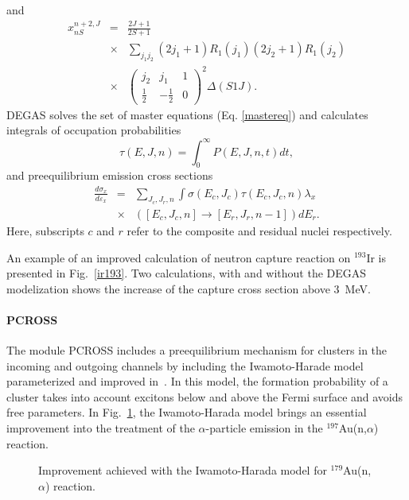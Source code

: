 \documentclass[twocolumn,amsmath,amssymb,10pt,groupedaddress,a4paper]{revtex4}
\begin{document}
and
\begin{eqnarray}
x_{nS}^{n+2,J}&=&\frac{2J+1}{2S+1}\nonumber\\
&\times&\sum_{j_{1}j_{2}}(2j_{1}+1)R_{1}(j_{1})(2j_{2}+1)R_{1}(j_{2})\nonumber\\
&\times&\left(\begin{array}{ccc}
j_{2} & j_{1} & 1\\
\frac{1}{2} & -\frac{1}{2} & 0\end{array}\right)^{2}\Delta(S1J).
\end{eqnarray}
DEGAS solves the set of master equations (Eq. \ref{mastereq})
and calculates integrals of occupation probabilities
\begin{equation}
\tau(E,J,n)=\int_{0}^{\infty}P(E,J,n,t)dt,
\end{equation}
and preequilibrium emission cross sections
\begin{eqnarray}
\frac{d\sigma_{x}}{d\varepsilon_{x}}&=&\sum_{J_{c},J_{r},n}\int\sigma(E_{c},J_{c})\tau(E_{c},J_{c},n)\lambda_{x}\nonumber\\
&\times&\left(\left[E_{c},J_{c},n\right]\rightarrow\left[E_{r},J_{r},n-1\right]\right)dE_{r}.
\end{eqnarray}
Here, subscripts $c$ and $r$ refer to the composite and residual
nuclei respectively.

An example of an improved calculation of neutron capture reaction on $^{193}$Ir is presented
in Fig.~\ref{ir193}. Two calculations, with and without the DEGAS modelization shows the increase
of the capture cross section above 3~MeV.



\paragraph{PCROSS}
The module PCROSS includes a preequilibrium mechanism for clusters in the incoming and outgoing
channels by including the Iwamoto-Harade model~\cite{Iwamoto} parameterized and improved
in~\cite{Sato,Zhang1,Zhang2}. In this model, the formation probability of a cluster takes into
account excitons below and above the Fermi surface and avoids free parameters. In Fig.~\ref{goldna},
the Iwamoto-Harada model brings an essential improvement into the treatment of the $\alpha$-particle
 emission in the $^{197}$Au(n,$\alpha$) reaction.
\begin{figure}[htbp]
\caption{Improvement achieved with the Iwamoto-Harada model for $^{179}$Au(n,$\alpha$) reaction.}
\label{goldna}
\end{figure}
\end{document}
